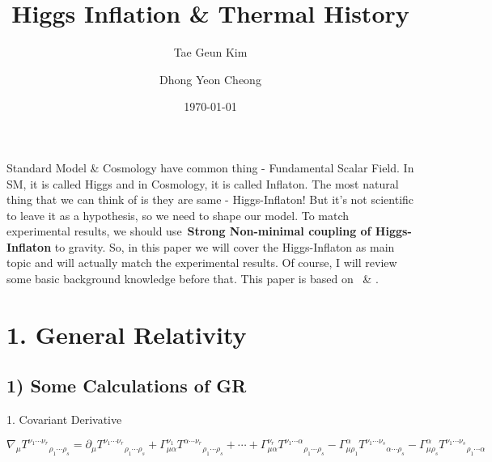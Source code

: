 \documentclass[10pt]{article}
\let\cite\citep
\renewenvironment{abstract}
  {{\bfseries\noindent{\abstractname}\par\nobreak}\footnotesize}
  {\bigskip}
\providecommand\citet{\cite}
\providecommand\citep{\cite}
\begin{document}
\title{Higgs Inflation \& Thermal History}

\author[1]{Tae Geun Kim}%
\author[1]{Dhong Yeon Cheong}%
%

\vspace{-1em}

  \date{\today}

\begingroup
\let\center\flushleft
\let\endcenter\endflushleft
\maketitle
\endgroup


\begin{abstract}
Standard Model \& Cosmology have common thing - Fundamental Scalar
Field. In SM, it is called Higgs and in Cosmology, it is called
Inflaton. The most natural thing that we can think of is they are same -
Higgs-Inflaton! But it's not scientific to leave it as a hypothesis, so
we need to shape our model. To match experimental results, we should
use~\textbf{Strong Non-minimal coupling of Higgs-Inflaton} to gravity.
So, in this paper we will cover the Higgs-Inflaton as main topic and
will actually match the experimental results. Of course, I will review
some basic background knowledge before that. This paper is based
on~\citet{Steinwachs_2014} \& \citet{Hamada_2015}.%
\end{abstract}%



\section*{1. General Relativity}

{\label{269001}}\par\null

\subsection*{1) Some Calculations of GR}

{\label{951564}}\par\null

1. Covariant Derivative

\begin{equation}
\nabla_{\mu}{T^{\nu_1\cdots\nu_r}}_{\rho_1\cdots\rho_s}=\partial_\mu {T^{\nu_1\cdots\nu_r}}_{\rho_1\cdots\rho_s} + \Gamma^{\nu_1}_{\mu\alpha}{T^{\alpha\cdots\nu_r}}_{\rho_1\cdots\rho_s} + \cdots + \Gamma^{\nu_r}_{\mu\alpha}{T^{\nu_1\cdots\alpha}}_{\rho_1\cdots\rho_s} - \Gamma^\alpha_{\mu\rho_1}{T^{\nu_1\cdots\nu_s}}_{\alpha\cdots\rho_s} - \Gamma^\alpha_{\mu\rho_s}{T^{\nu_1\cdots\nu_s}}_{\rho_1\cdots\alpha}
\end{equation}
\end{document}
